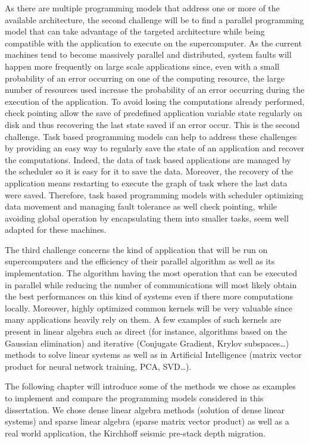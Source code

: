 As there are multiple programming models that address one or more of the available architecture, the second challenge will be to find a parallel programming model that can take advantage of the targeted architecture while being compatible with the application to execute on the supercomputer.
As the current machines tend to become massively parallel and distributed, system faults will happen more frequently on large scale applications since, even with a small probability of an error occurring on one of the computing resource, the large number of resources used increase the probability of an error occurring during the execution of the application.
To avoid losing the computations already performed, check pointing allow the save of predefined application variable state regularly on disk and thus recovering the last state saved if an error occur.
This is the second challenge.
Task based programming models can help to address these challenges by providing an easy way to regularly save the state of an application and recover the computations.
Indeed, the data of task based applications are managed by the scheduler so it is easy for it to save the data.
Moreover, the recovery of the application means restarting to execute the graph of task where the last data were saved.
Therefore, task based programming models with scheduler optimizing data movement and managing fault tolerance as well check pointing, while avoiding global operation by encapsulating them into smaller tasks, seem well adapted for these machines.

The third challenge concerns the kind of application that will be run on supercomputers and the efficiency of their parallel algorithm as well as its implementation.
The algorithm having the most operation that can be executed in parallel while reducing the number of communications will most likely obtain the best performances on this kind of systems even if there more computations locally.
Moreover, highly optimized common kernels will be very valuable since many applications heavily rely on them.
A few examples of such kernels are present in linear algebra such as direct (for instance, algorithms based on the Gaussian elimination) and iterative (Conjugate Gradient, Krylov subspaces\dots) methods to solve linear systems as well as in Artificial Intelligence (matrix vector product for neural network training, PCA, SVD\dots).

The following chapter will introduce some of the methods we chose as examples to implement and compare the programming models considered in this dissertation.
We chose dense linear algebra methods (solution of dense linear systems) and sparse linear algebra (sparse matrix vector product) as well as a real world application, the Kirchhoff seismic pre-stack depth migration.
